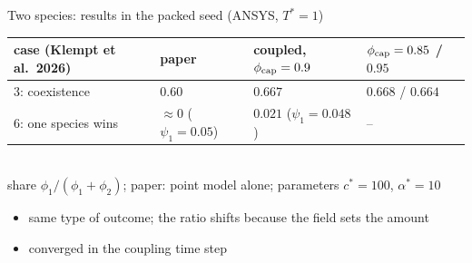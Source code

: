 \documentclass[aspectratio=169,11pt]{beamer}
\begin{document}
\begin{frame}{Two species: results in the packed seed (ANSYS, $T^*=1$)}
\centering
\begin{tabular}{@{}llll@{}}
\toprule
case (Klempt et al.\ 2026) & paper & coupled, $\phi_{\rm cap}=0.9$ & $\phi_{\rm cap}=0.85$ / $0.95$\\
\midrule
3: coexistence & $0.60$ & $0.667$ & $0.668$ / $0.664$\\
6: one species wins & $\approx0$ ($\psi_1=0.05$) & $0.021$ ($\psi_1=0.048$) & --\\
\bottomrule
\end{tabular}\\[4pt]
\footnotesize share $\phi_1/(\phi_1+\phi_2)$; paper: point model alone; parameters $c^*=100$, $\alpha^*=10$
\vspace{10pt}
\begin{itemize}\small
  \item same type of outcome; the ratio shifts because the field sets the amount
  \item converged in the coupling time step
\end{itemize}
\end{frame}
\end{document}
